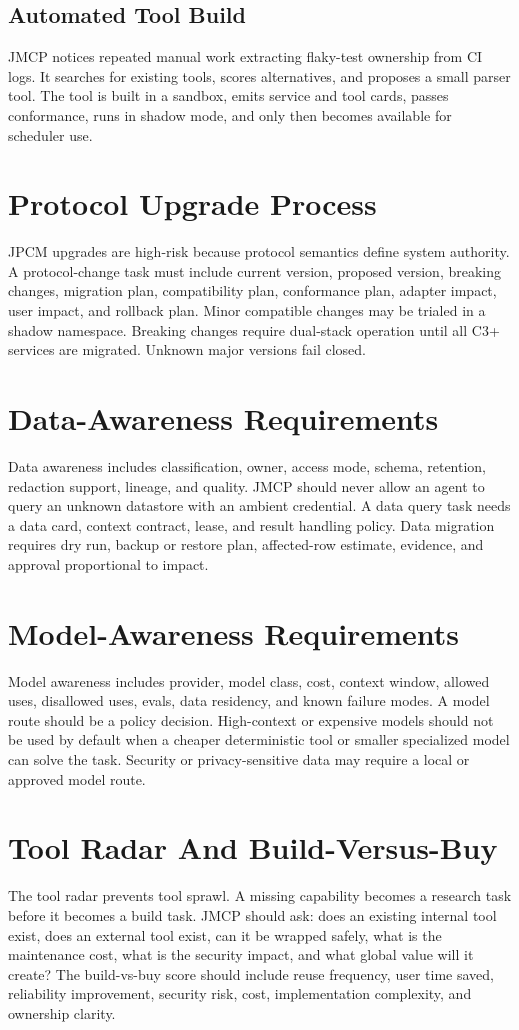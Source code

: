 \documentclass[10pt,journal,onecolumn]{IEEEtran}
\begin{document}
\subsection{Automated Tool Build}
JMCP notices repeated manual work extracting flaky-test ownership from CI logs. It searches for existing tools, scores alternatives, and proposes a small parser tool. The tool is built in a sandbox, emits service and tool cards, passes conformance, runs in shadow mode, and only then becomes available for scheduler use.

\section{Protocol Upgrade Process}
JPCM upgrades are high-risk because protocol semantics define system authority. A protocol-change task must include current version, proposed version, breaking changes, migration plan, compatibility plan, conformance plan, adapter impact, user impact, and rollback plan. Minor compatible changes may be trialed in a shadow namespace. Breaking changes require dual-stack operation until all C3+ services are migrated. Unknown major versions fail closed.

\section{Data-Awareness Requirements}
Data awareness includes classification, owner, access mode, schema, retention, redaction support, lineage, and quality. JMCP should never allow an agent to query an unknown datastore with an ambient credential. A data query task needs a data card, context contract, lease, and result handling policy. Data migration requires dry run, backup or restore plan, affected-row estimate, evidence, and approval proportional to impact.

\section{Model-Awareness Requirements}
Model awareness includes provider, model class, cost, context window, allowed uses, disallowed uses, evals, data residency, and known failure modes. A model route should be a policy decision. High-context or expensive models should not be used by default when a cheaper deterministic tool or smaller specialized model can solve the task. Security or privacy-sensitive data may require a local or approved model route.

\section{Tool Radar And Build-Versus-Buy}
The tool radar prevents tool sprawl. A missing capability becomes a research task before it becomes a build task. JMCP should ask: does an existing internal tool exist, does an external tool exist, can it be wrapped safely, what is the maintenance cost, what is the security impact, and what global value will it create? The build-vs-buy score should include reuse frequency, user time saved, reliability improvement, security risk, cost, implementation complexity, and ownership clarity.
\end{document}

